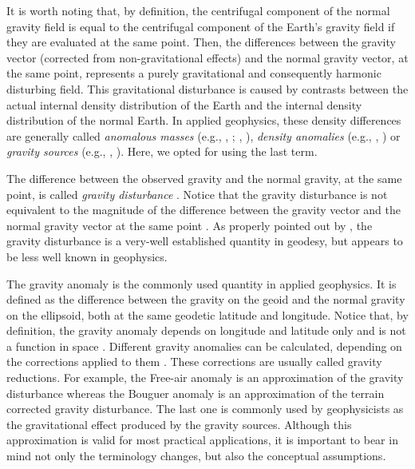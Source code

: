 \documentclass[extra]{gji}
\begin{document}
It is worth noting that, by definition, 
the centrifugal component of the normal gravity field is
equal to the centrifugal component of the Earth's gravity
field if they are evaluated at the same point.
Then, the differences between the gravity vector
(corrected from non-gravitational effects) 
and the normal gravity vector, at the same point, represents a purely 
gravitational and consequently harmonic disturbing field.
This gravitational disturbance 
is caused by contrasts between the actual internal 
density distribution of the Earth and the internal density 
distribution of the normal Earth.
In applied geophysics, these density differences are generally 
called \textit{anomalous masses} (e.g., \citeauthor{hammer1945}, 
\citeyear{hammer1945}; \citeauthor{lafehr1965}, \citeyear{lafehr1965}),
\textit{density anomalies} (e.g., \citeauthor{forsberg1984}, \citeyear{forsberg1984})
or \textit{gravity sources} (e.g., \citeauthor{blakely1996}, 
\citeyear{blakely1996}). Here, we opted for using the last term.

The difference between the observed gravity and the
normal gravity, at the same point, is called \textit{gravity disturbance}
\citep{heiskanen-moritz1967, hofmann-wellenhof-moritz2005}.
Notice that the gravity disturbance is not equivalent to the
magnitude of the difference between the gravity vector
and the normal gravity vector at the same point 
\citep{barthelmes2013, sanso_sideris2013}.
As properly pointed out by \citet{hackney-featherstone2003},
the gravity disturbance is a very-well established quantity in geodesy,
but appears to be less well known in geophysics.

The gravity anomaly is the commonly used quantity in applied 
geophysics. It is defined as the difference
between the gravity on the geoid and the normal gravity on the ellipsoid,
both at the same geodetic latitude and longitude.
Notice that, by definition, the gravity anomaly depends on 
longitude and latitude only and is not a function in space 
\citep{barthelmes2013}.
Different gravity anomalies can be calculated, depending on the
corrections applied to them \citep{blakely1996, hofmann-wellenhof-moritz2005}.
These corrections are usually called gravity reductions.
For example, the Free-air anomaly is an approximation of the
gravity disturbance whereas the Bouguer anomaly
is an approximation of the terrain corrected gravity disturbance.
The last one is commonly used by geophysicists as the
gravitational effect produced by the gravity sources.
Although this approximation is valid for most practical applications,
it is important to bear in mind not only the terminology 
changes, but also the conceptual assumptions.
\end{document}
